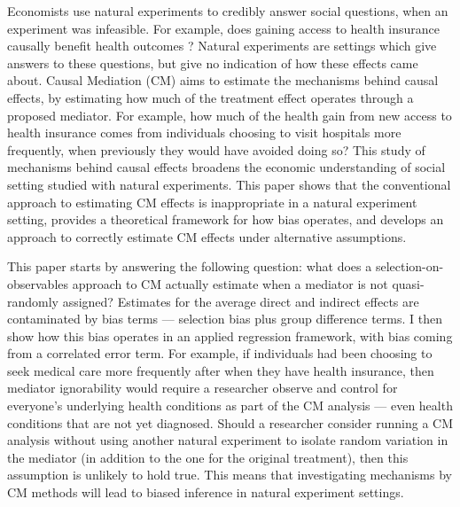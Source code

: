 Economists use natural experiments to credibly answer social questions, when an experiment was infeasible.
For example, does gaining access to health insurance causally benefit health outcomes \citep{finkelstein2008oregon}?
Natural experiments are settings which give answers to these questions, but give no indication of how these effects came about.
Causal Mediation (CM) aims to estimate the mechanisms behind causal effects, by estimating how much of the treatment effect operates through a proposed mediator.
For example, how much of the health gain from new access to health insurance comes from individuals choosing to visit hospitals more frequently, when previously they would have avoided doing so?
This study of mechanisms behind causal effects broadens the economic understanding
of social setting studied with natural experiments.
This paper shows that the conventional approach to estimating CM effects is inappropriate in a natural experiment setting, provides a theoretical framework for how bias operates, and develops an approach to correctly estimate CM effects under alternative assumptions.


This paper starts by answering the following question: what does a selection-on-observables approach to CM actually estimate when a mediator is not quasi-randomly assigned?
Estimates for the average direct and indirect effects are contaminated by bias terms --- selection bias plus group difference terms.
I then show how this bias operates in an applied regression framework, with bias coming from a correlated error term.
For example, if individuals had been choosing to seek medical care more frequently after when they have health insurance, then mediator ignorability would require a researcher observe and control for everyone's underlying health conditions as part of the CM analysis --- even health conditions that are not yet diagnosed.
Should a researcher consider running a CM analysis without using another natural experiment to isolate random variation in the mediator (in addition to the one for the original treatment), then this assumption is unlikely to hold true.
This means that investigating mechanisms by CM methods will lead to biased inference in natural experiment settings.

